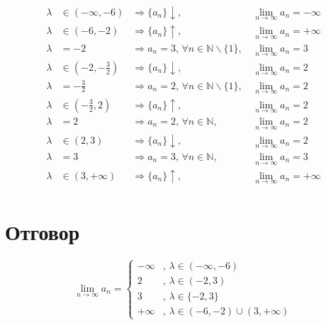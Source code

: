 \documentclass{article}
\begin{document}
\begin{align*}
    \lambda &\in (-\infty, -6) &\Longrightarrow \{a_n\}\downarrow ,&\, \lim_{n \to \infty} a_n = -\infty \\
    \lambda &\in (-6, -2) &\Longrightarrow \{a_n\}\uparrow ,&\, \lim_{n \to \infty} a_n = +\infty \\
    \lambda &= -2 &\Longrightarrow a_n = 3,\, \forall n \in \mathbb{N}\backslash\{1\},&\, \lim_{n \to \infty} a_n = 3 \\
    \lambda &\in \left(-2, -\frac{3}{2}\right) &\Longrightarrow \{a_n\}\downarrow ,&\, \lim_{n \to \infty} a_n = 2 \\
    \lambda &= -\frac{3}{2} &\Longrightarrow a_n = 2,\, \forall n \in \mathbb{N}\backslash\{1\},&\, \lim_{n \to \infty} a_n = 2 \\
    \lambda &\in \left(-\frac{3}{2}, 2\right) &\Longrightarrow \{a_n\}\uparrow ,&\, \lim_{n \to \infty} a_n = 2 \\
    \lambda &= 2 &\Longrightarrow a_n = 2,\, \forall n \in \mathbb{N},&\, \lim_{n \to \infty} a_n = 2 \\
    \lambda &\in (2, 3) &\Longrightarrow \{a_n\}\downarrow ,&\, \lim_{n \to \infty} a_n = 2 \\
    \lambda &= 3 &\Longrightarrow a_n = 3,\, \forall n \in \mathbb{N},&\, \lim_{n \to \infty} a_n = 3 \\
    \lambda &\in (3, +\infty) &\Longrightarrow \{a_n\}\uparrow ,&\, \lim_{n \to \infty} a_n = +\infty \\
\end{align*}

\section{Отговор}

\begin{equation*}
    \lim_{n \to \infty} a_n =
    \begin{cases}
        -\infty &,\, \lambda \in (-\infty, -6) \\
        2       &,\, \lambda \in (-2, 3) \\
        3       &,\, \lambda \in \{-2, 3\} \\
        +\infty &,\, \lambda \in (-6, -2) \cup (3, +\infty)
    \end{cases}
\end{equation*}
\end{document}
